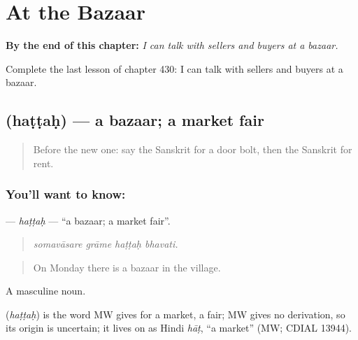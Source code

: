 
\chapter{At the Bazaar}
\label{ch:sa-at-the-bazaar}

\begin{chapteropening}
\textbf{By the end of this chapter:} \emph{I can talk with sellers and buyers at a bazaar.}

Complete the last lesson of chapter 430: I can talk with sellers and buyers at a bazaar.
\end{chapteropening}

\section[\texorpdfstring{\sk{हट्टः} (haṭṭaḥ)}{हट्टः (haṭṭaḥ)}]{ (haṭṭaḥ) — a bazaar; a market fair}

\label{lesson:SA-C430-hattah}



\begin{quote}
Before the new one: say the Sanskrit for a door bolt, then the Sanskrit for rent.
\end{quote}

\subsection*{You'll want to know: }
\textbf{} — \emph{haṭṭaḥ} — \textquotedblleft{}a bazaar; a market fair\textquotedblright{}.

\begin{quote}
   
\end{quote}

\begin{quote}
\emph{somavāsare grāme haṭṭaḥ bhavati.}
\end{quote}

\begin{quote}
On Monday there is a bazaar in the village.
\end{quote}

A masculine noun.

\begin{cousinweb}
\textbf{} (\emph{haṭṭaḥ}) is the word MW gives for a market, a fair; MW gives no derivation, so its origin is uncertain; it lives on as Hindi \emph{hāṭ}, \textquotedblleft{}a market\textquotedblright{} (MW; CDIAL 13944).
\end{cousinweb}

